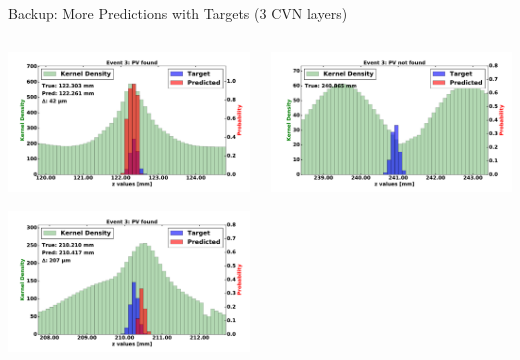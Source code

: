 \begin{frame}{Backup: More Predictions with Targets (3 CVN layers)}
  \begin{columns}[c]
        \begin{center}
            \includegraphics[width=1\textwidth,height=0.45\textwidth, trim=18 0 18 0]{images/120000_3layer_20.pdf}
    
            \includegraphics[width=1\textwidth, height=0.45\textwidth,trim=18 0 18 0]{images/120000_3layer_21.pdf}

        \end{center}
        \begin{center}
           \includegraphics[width=1\textwidth, height=0.45\textwidth, trim=18 0 18 0]{images/120000_3layer_22.pdf}
    

\end{center}
\end{columns}
\end{frame}
